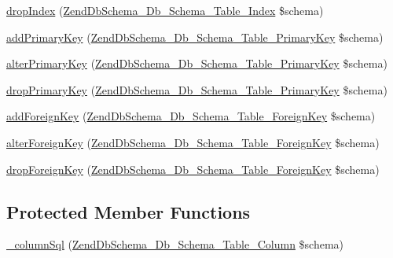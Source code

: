 \begin{DoxyCompactItemize}
\hyperlink{classZendDbSchema__Db__Schema__Generator__Mysql__Table_acb80829a10a192635417efba5b9d5439}{drop\-Index} (\hyperlink{classZendDbSchema__Db__Schema__Table__Index}{Zend\-Db\-Schema\-\_\-\-Db\-\_\-\-Schema\-\_\-\-Table\-\_\-\-Index} \$schema)
\item 
\hyperlink{classZendDbSchema__Db__Schema__Generator__Mysql__Table_a9daf95057d9d7a294b6ef45487818503}{add\-Primary\-Key} (\hyperlink{classZendDbSchema__Db__Schema__Table__PrimaryKey}{Zend\-Db\-Schema\-\_\-\-Db\-\_\-\-Schema\-\_\-\-Table\-\_\-\-Primary\-Key} \$schema)
\item 
\hyperlink{classZendDbSchema__Db__Schema__Generator__Mysql__Table_ade1a7272ca13e357fed6a1f96179bb8c}{alter\-Primary\-Key} (\hyperlink{classZendDbSchema__Db__Schema__Table__PrimaryKey}{Zend\-Db\-Schema\-\_\-\-Db\-\_\-\-Schema\-\_\-\-Table\-\_\-\-Primary\-Key} \$schema)
\item 
\hyperlink{classZendDbSchema__Db__Schema__Generator__Mysql__Table_a8204749fa41366650dee5e3e3d9fac03}{drop\-Primary\-Key} (\hyperlink{classZendDbSchema__Db__Schema__Table__PrimaryKey}{Zend\-Db\-Schema\-\_\-\-Db\-\_\-\-Schema\-\_\-\-Table\-\_\-\-Primary\-Key} \$schema)
\item 
\hyperlink{classZendDbSchema__Db__Schema__Generator__Mysql__Table_ab0e8de60124040b8a92e5c9f3e2d63d0}{add\-Foreign\-Key} (\hyperlink{classZendDbSchema__Db__Schema__Table__ForeignKey}{Zend\-Db\-Schema\-\_\-\-Db\-\_\-\-Schema\-\_\-\-Table\-\_\-\-Foreign\-Key} \$schema)
\item 
\hyperlink{classZendDbSchema__Db__Schema__Generator__Mysql__Table_a3b806bcbce70989120035d56ee12071c}{alter\-Foreign\-Key} (\hyperlink{classZendDbSchema__Db__Schema__Table__ForeignKey}{Zend\-Db\-Schema\-\_\-\-Db\-\_\-\-Schema\-\_\-\-Table\-\_\-\-Foreign\-Key} \$schema)
\item 
\hyperlink{classZendDbSchema__Db__Schema__Generator__Mysql__Table_aa5d8bf2e4379b7acc7bcd57ea36e23ba}{drop\-Foreign\-Key} (\hyperlink{classZendDbSchema__Db__Schema__Table__ForeignKey}{Zend\-Db\-Schema\-\_\-\-Db\-\_\-\-Schema\-\_\-\-Table\-\_\-\-Foreign\-Key} \$schema)
\end{DoxyCompactItemize}
\subsection*{Protected Member Functions}
\begin{DoxyCompactItemize}
\item 
\hyperlink{classZendDbSchema__Db__Schema__Generator__Mysql__Table_a86ed47276429129c5962489dcd370e0e}{\-\_\-column\-Sql} (\hyperlink{classZendDbSchema__Db__Schema__Table__Column}{Zend\-Db\-Schema\-\_\-\-Db\-\_\-\-Schema\-\_\-\-Table\-\_\-\-Column} \$schema)
\end{DoxyCompactItemize}


